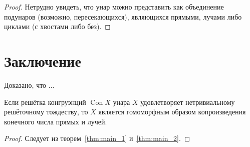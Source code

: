 \documentclass[11pt,twoside,final
]{article}
\def\Con{\operatorname{Con}}
\def\indeg{\operatorname{indeg}}
\begin{document}
\begin{proof}
	Нетрудно увидеть, что унар можно представить как объединение подунаров (возможно, пересекающихся), являющихся прямыми, лучами либо циклами (с хвостами либо без).

\end{proof}

\section{Заключение}

Доказано, что ...

\begin{corollary}
	Если решётка конгруэнций $\Con X$ унара $X$ удовлетворяет нетривиальному решёточному тождеству, то $X$ является гомоморфным образом копроизведения конечного числа прямых и лучей.
\end{corollary}
\begin{proof}
	Следует из теорем~\ref{thm:main_1} и~\ref{thm:main_2}.
\end{proof}
\end{document}

